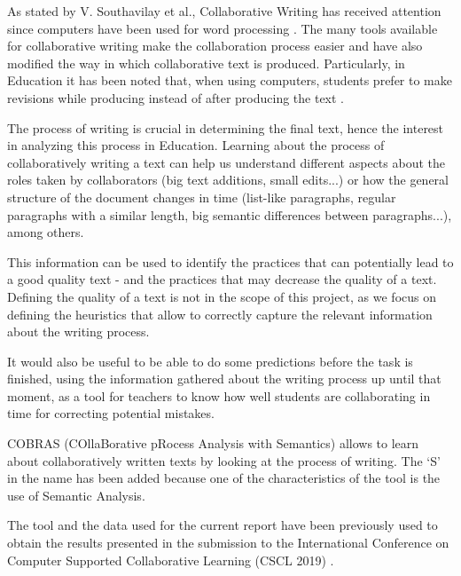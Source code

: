   As stated by V. Southavilay et al., Collaborative Writing has received attention since computers have been used for word processing  \cite{southavilay2009writeproc}. The many tools available for collaborative writing make the collaboration process easier and have also modified the way in which collaborative text is produced. Particularly, in Education it has been noted that, when
  using computers, students prefer to make revisions while producing instead of after producing the text \cite{ref6}.

  The process of writing is crucial in determining the final text, hence the interest in analyzing this process in Education. Learning about the process of collaboratively writing a text can help us understand different aspects about the roles taken by collaborators (big text additions, small edits...) or how the general structure of the document changes in time (list-like paragraphs, regular paragraphs with a similar length, big semantic differences between paragraphs...), among others.

  This information can be used to identify the practices that can potentially lead to a good quality text - and the practices that may decrease the quality of a text. Defining the quality of a text is not in the scope of this project, as we focus on defining the heuristics that allow to correctly capture the relevant information about the writing process.

  It would also be useful to be able to do some predictions before the task is finished, using the information gathered about the writing process up until that moment, as a tool for teachers to know how well students are collaborating in time for correcting potential mistakes.

  COBRAS (COllaBorative pRocess Analysis with Semantics) allows to learn about collaboratively written texts by looking at the process of writing. The `S' in the name has been added because one of the characteristics of the tool is the use of Semantic Analysis.
  
  The tool and the data used for the current report have been previously used to obtain the results presented in the submission to the International Conference on Computer Supported Collaborative Learning (CSCL 2019) \cite{cscl19}.